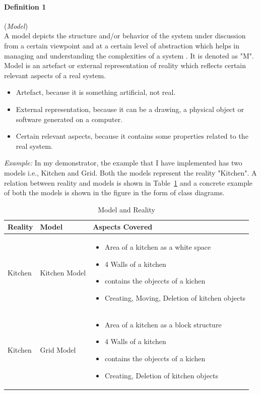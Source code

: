 \paragraph{Definition 1} (\textit{Model})\\
A model depicts the structure and/or behavior of the system under discussion from a certain viewpoint and at a certain level of abstraction which helps in managing and understanding the complexities of a system \cite{uml} \cite{mdsd}. It is denoted as "M".
\newline\newline Model is an artefact or external representation of reality which reflects certain relevant aspects of a real system. 
\begin{itemize}
\item {Artefact, because it is something artificial, not real.}
\item {External representation, because it can be a drawing, a physical object or software generated on a computer.}
\item {Certain relevant aspects, because it contains some properties related to the real system.}
\end{itemize}
\textit{Example:} In my demonstrator, the example that I have implemented has two models i.e., Kitchen and Grid. Both the models represent the reality "Kitchen". A relation between reality and models is shown in Table~\ref{tab:Model_Reality} and a concrete example of both the models is shown in the figure in the form of class diagrams.

\begin{table}
	\centering	
	\begin{tabular}{|p{3cm}|p{3cm}|p{9cm}|}
		\hline
		\rowcolor[gray]{.8}	
		\textbf{Reality} & \textbf{Model} & \textbf{Aspects Covered} \\
		\hline
		Kitchen & Kitchen Model & 
		\begin{itemize}
			\item Area of a kitchen as a white space
			\item 4 Walls of a kitchen
			\item contains the objeccts of a kichen
			\item Creating, Moving, Deletion of kitchen objects
		\end{itemize}\\
		\hline
		Kitchen & Grid Model & 
		\begin{itemize}
			\item Area of a kitchen as a block structure
			\item 4 Walls of a kitchen
			\item contains the objeccts of a kichen
			\item Creating, Deletion of kitchen objects
		\end{itemize}\\
		\hline					
		
	\end{tabular}
	\label{tab:Model_Reality}
	\caption{Model and Reality}
\end{table}

